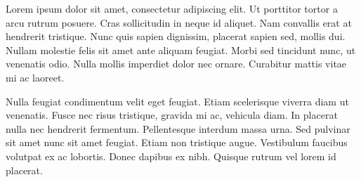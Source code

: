
Lorem ipsum dolor sit amet, consectetur adipiscing elit. Ut porttitor tortor a arcu rutrum posuere. Cras sollicitudin in neque id aliquet. Nam convallis erat at hendrerit tristique. Nunc quis sapien dignissim, placerat sapien sed, mollis dui. Nullam molestie felis sit amet ante aliquam feugiat. Morbi sed tincidunt nunc, ut venenatis odio. Nulla mollis imperdiet dolor nec ornare. Curabitur mattis vitae mi ac laoreet.

Nulla feugiat condimentum velit eget feugiat. Etiam scelerisque viverra diam ut venenatis. Fusce nec risus tristique, gravida mi ac, vehicula diam. In placerat nulla nec hendrerit fermentum. Pellentesque interdum massa urna. Sed pulvinar sit amet nunc sit amet feugiat. Etiam non tristique augue. Vestibulum faucibus volutpat ex ac lobortis. Donec dapibus ex nibh. Quisque rutrum vel lorem id placerat.
